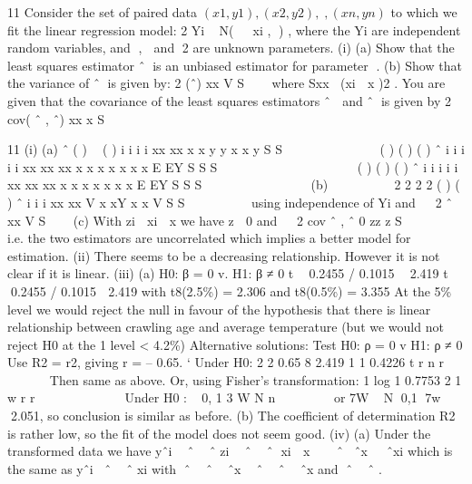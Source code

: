 \documentclass[a4paper,12pt]{article}
\begin{document}
\begin{enumerate}

11 Consider the set of paired data $(x1, y1), (x2 , y2 ),,(xn , yn )$ to which we fit the linear
regression model:
  2
Yi ~ N(  xi , ) ,
where the Yi are independent random variables, and ,  and 2 are unknown
parameters.
(i) (a) Show that the least squares estimator ˆ is an unbiased estimator for
parameter .
(b) Show that the variance of ˆ is given by:
  2
(ˆ)
xx
V
S

 
where Sxx (xi  x )2 .
You are given that the covariance of the least squares estimators ˆ  and ˆ is
given by
2
cov( ˆ , ˆ)
xx
x
S

11 (i) (a)
ˆ ( )  ( )
i i i i
xx xx
x x y y x x y
S S
  
    
    ( ) ( ) ( )
ˆ i i i i
i
xx xx xx
x x x x x x x
E EY
S S S
  
         
    ( ) ( ) ( )
ˆ i i i i
i
xx xx xx
x x x x x x x
E EY
S S S
  
         
(b)    
   
2 2
2 2
( ) ( )
ˆ i i i
xx xx
V x xY x x
V
S S
  
     using independence of Yi
and   2
ˆ
xx
V
S

 
(c) With zi  xi  x we have z  0 and   2
cov ˆ , ˆ 0
zz
z
S

   
i.e. the two estimators are uncorrelated which implies a better model for estimation.
(ii) There seems to be a decreasing relationship. However it is not clear if it is linear.
(iii) (a) H0: β = 0 v. H1: β ≠ 0
t  0.2455 / 0.1015  2.419 t  0.2455 / 0.1015  2.419
with t8(2.5\%) = 2.306 and t8(0.5\%) = 3.355
At the 5\% level we would reject the null in favour of the hypothesis that there is linear relationship between crawling age and average
temperature (but we would not reject H0 at the 1%
             level < 4.2\%)
Alternative solutions:
  Test H0: ρ = 0 v H1: ρ ≠ 0
Use R2 = r2, giving r = – 0.65.
` Under H0:
  2
2 0.65 8 2.419
1 1 0.4226
t r n
r
 
  
 
Then same as above.
Or, using Fisher’s transformation:
  1 log 1 0.7753
2 1
w r
r
          
Under H0 :
  ~ 0, 1
3
W N
n
 
    
or 7W ~ N 0,1
7w  2.051, so conclusion is similar as before.
(b) The coefficient of determination R2 is rather low, so the fit of the
model does not seem good.
(iv) (a) Under the transformed data we have
yˆi  ˆ  ˆ zi  ˆ  ˆ xi  x   ˆ ˆx  ˆxi
which is the same as yˆi ˆ  ˆ xi with ˆ  ˆ  ˆx  ˆ  ˆ  ˆx and
ˆ  ˆ .

\end{enumerate}
\end{document}
